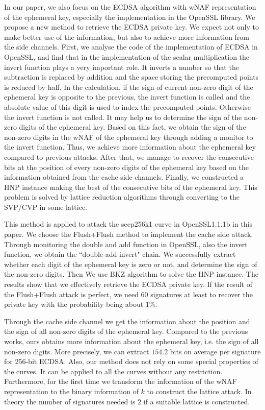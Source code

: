 In our paper, we also focus on the ECDSA algorithm with wNAF representation of the ephemeral key, especially the implementation in the OpenSSL library.
 We propose a new method to retrieve the ECDSA private key.
We expect not only to make better use of the information,
  but also to achieve more information from the side channels.
First, we analyse the code of the implementation of ECDSA in OpenSSL,
 and find that
in the implementation of the scalar multiplication the invert function plays a very important role.
It inverts a number so that the subtraction is replaced by addition and the space storing the precomputed points is reduced by half.
In the calculation, if the sign of current non-zero digit of the ephemeral key is opposite to the previous, the invert function is called  and the absolute value of this digit is used to index the precomputed points. Otherwise the invert function is not called.
It may help us to determine the sign of the non-zero digits of the ephemeral key.
  Based on this fact, we obtain the sign of the non-zero digits in the wNAF of the ephemeral key through adding a monitor to the invert function.
 Thus, we achieve more information about the ephemeral key compared to previous attacks.
After that, we manage to recover the consecutive bits at the position of every non-zero digits of the ephemeral key based on the information obtained from the cache side channels.
Finally, we constructed a HNP \cite{boneh1996} instance making the best of the consecutive bits of the ephemeral key.
This problem is solved by lattice reduction algorithms  through converting to the SVP/CVP in some lattice.

This method is applied to attack the secp256k1 curve in OpenSSL1.1.1b in this paper.
We choose the Flush+Flush\cite{gruss2016flush} method to implement the cache side attack.
Through monitoring the double and add function in OpenSSL, also the  invert function, we obtain the ``double-add-invert" chain.
We successfully extract whether each digit of the ephemeral key is zero or not, and determine the sign of the non-zero digits.
Then We use BKZ \cite{Schnorr1994} algorithm to solve the HNP instance.
The results show that we effectively retrieve the ECDSA private key.
If the result of the Flush+Flush attack is perfect, we need $60$ signatures at least to recover the private key with the probability being about $1\%$.

Through the cache side channel we get the information about the position and the sign of all non-zero digits of the ephemeral key.
Compared to the previous works, ours obtains more information about the ephemeral key, i.e. the sign of all non-zero digits.
 More precisely, we can extract $154.2$ bits on average per signature for 256-bit ECDSA.
Also, our method does not rely on some special properties of the curves.
It  can be applied to all the curves without any restriction.
Furthermore,  for the first time we transform the information of the wNAF representation to the binary information of $k$ to construct the lattice attack.
In theory the number of signatures needed is $2$ if a suitable lattice is constructed.




